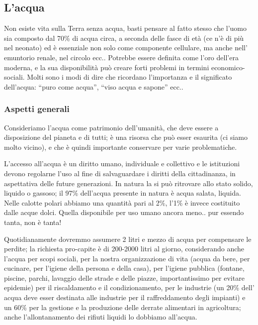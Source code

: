 \subsection{L'acqua}

Non esiste vita sulla Terra senza acqua, basti pensare al fatto stesso
che l'uomo sia composto dal 70\% di acqua circa, a seconda delle fasce
di età (ce n'è di più nel neonato) ed è essenziale non solo come
componente cellulare, ma anche nell' emuntorio renale, nel circolo ecc..
Potrebbe essere definita come l'oro dell'era moderna, e la sua
disponibilità può creare forti problemi in termini economico-sociali.
Molti sono i modi di dire che ricordano l'importanza e il significato
dell'acqua: ``puro come acqua'', ``viso acqua e sapone'' ecc..

\subsubsection{Aspetti generali}

Consideriamo l'acqua come patrimonio dell'umanità, che deve essere a
disposizione del pianeta e di tutti; è una risorsa che può esser
esaurita (ci siamo molto vicino), e che è quindi importante conservare
per varie problematiche.

L'accesso all'acqua è un diritto umano, individuale e collettivo e le
istituzioni devono regolarne l'uso al fine di salvaguardare i diritti
della cittadinanza, in aspettativa delle future generazioni. In natura
la si può ritrovare allo stato solido, liquido o gassoso; il 97\%
dell'acqua presente in natura è acqua salata, liquida. Nelle calotte
polari abbiamo una quantità pari al 2\%, l'1\% è invece costituito dalle
acque dolci. Quella disponibile per uso umano ancora meno.. pur essendo
tanta, non è tanta!

Quotidianamente dovremmo assumere 2 litri e mezzo di acqua per
compensare le perdite; la richiesta pro-capite è di 200-2000 litri al
giorno, considerando anche l'acqua per scopi sociali, per la nostra
organizzazione di vita (acqua da bere, per cucinare, per l'igiene della
persona e della casa), per l'igiene pubblica (fontane, piscine, parchi,
lavaggio delle strade e delle piazze, importantissimo per evitare
epidemie) per il riscaldamento e il condizionamento, per le industrie
(un 20\% dell' acqua deve esser destinata alle industrie per il
raffreddamento degli impianti) e un 60\% per la gestione e la produzione
delle derrate alimentari in agricoltura; anche l'allontanamento dei
rifiuti liquidi lo dobbiamo all'acqua.

